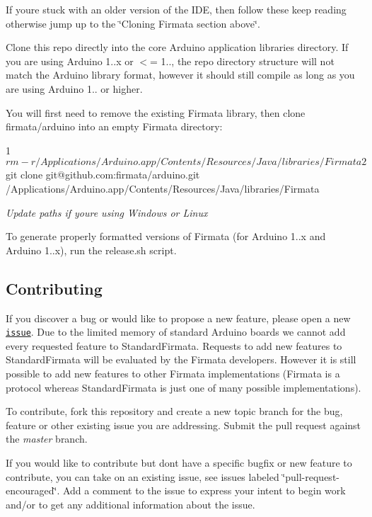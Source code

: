If you\textquotesingle{}re stuck with an older version of the I\+DE, then follow these keep reading otherwise jump up to the \char`\"{}\+Cloning Firmata section above\char`\"{}.

Clone this repo directly into the core Arduino application libraries directory. If you are using Arduino 1..\+x or $<$= 1.., the repo directory structure will not match the Arduino library format, however it should still compile as long as you are using Arduino 1.. or higher.

You will first need to remove the existing Firmata library, then clone firmata/arduino into an empty Firmata directory\+:


\begin{DoxyCode}
1 $ rm -r /Applications/Arduino.app/Contents/Resources/Java/libraries/Firmata
2 $ git clone git@github.com:firmata/arduino.git
       /Applications/Arduino.app/Contents/Resources/Java/libraries/Firmata
\end{DoxyCode}


{\itshape Update paths if you\textquotesingle{}re using Windows or Linux}

To generate properly formatted versions of Firmata (for Arduino 1..\+x and Arduino 1..\+x), run the {\ttfamily release.\+sh} script.

\label{_contributing}%
 \subsection*{Contributing}

If you discover a bug or would like to propose a new feature, please open a new \href{https://github.com/firmata/arduino/issues?sort=created&state=open}{\tt issue}. Due to the limited memory of standard Arduino boards we cannot add every requested feature to Standard\+Firmata. Requests to add new features to Standard\+Firmata will be evaluated by the Firmata developers. However it is still possible to add new features to other Firmata implementations (Firmata is a protocol whereas Standard\+Firmata is just one of many possible implementations).

To contribute, fork this repository and create a new topic branch for the bug, feature or other existing issue you are addressing. Submit the pull request against the {\itshape master} branch.

If you would like to contribute but don\textquotesingle{}t have a specific bugfix or new feature to contribute, you can take on an existing issue, see issues labeled \char`\"{}pull-\/request-\/encouraged\char`\"{}. Add a comment to the issue to express your intent to begin work and/or to get any additional information about the issue.

